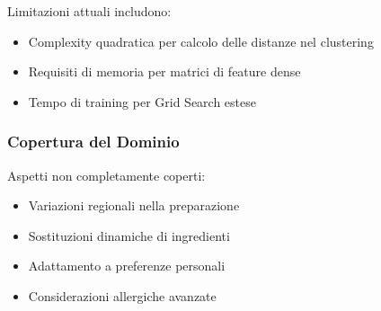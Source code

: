 \documentclass[12pt,a4paper]{article}
\begin{document}
Limitazioni attuali includono:
\begin{itemize}
    \item Complexity quadratica per calcolo delle distanze nel clustering
    \item Requisiti di memoria per matrici di feature dense
    \item Tempo di training per Grid Search estese
\end{itemize}

\subsubsection{Copertura del Dominio}

Aspetti non completamente coperti:
\begin{itemize}
    \item Variazioni regionali nella preparazione
    \item Sostituzioni dinamiche di ingredienti
    \item Adattamento a preferenze personali
    \item Considerazioni allergiche avanzate
\end{itemize}
\end{document}
